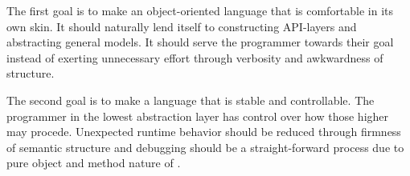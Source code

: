 The first goal is to make an object-oriented language that is comfortable in its own skin. It should naturally lend itself to constructing API-layers and abstracting general models. It should serve the programmer towards their goal instead of exerting unnecessary effort through verbosity and awkwardness of structure.

The second goal is to make a language that is stable and controllable. The programmer in the lowest abstraction layer has control over how those higher may procede. Unexpected runtime behavior should be reduced through firmness of semantic structure and debugging should be a straight-forward process due to pure object and method nature of \Lang{}.
